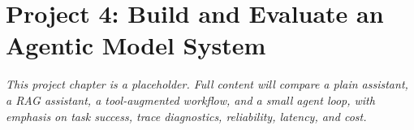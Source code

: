 \chapter*{Project 4: Build and Evaluate an Agentic Model System}
\label{project:agentic-system}


\textit{This project chapter is a placeholder. Full content will compare a plain assistant, a RAG assistant, a tool-augmented workflow, and a small agent loop, with emphasis on task success, trace diagnostics, reliability, latency, and cost.}
